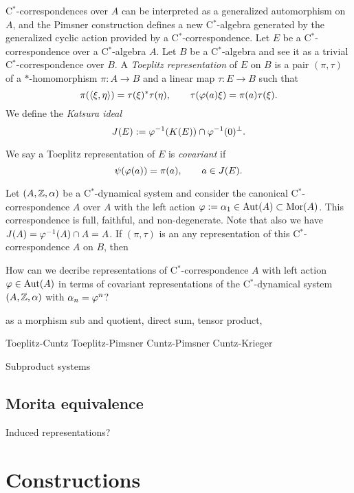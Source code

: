 \documentclass{../../large}
\begin{document}
\begin{prb}
C$^*$-correspondences over $A$ can be interpreted as a generalized automorphism on $A$, and the Pimsner construction defines a new C$^*$-algebra generated by the generalized cyclic action provided by a C$^*$-correspondence.
Let $E$ be a C$^*$-correspondence over a C$^*$-algebra $A$.
Let $B$ be a C$^*$-algebra and see it as a trivial C$^*$-correspondence over $B$.
A \emph{Toeplitz representation} of $E$ on $B$ is a pair $(\pi,\tau)$ of a $*$-homomorphism $\pi:A\to B$ and a linear map $\tau:E\to B$ such that
\[\pi(\langle\xi,\eta\rangle)=\tau(\xi)^*\tau(\eta),\qquad\tau(\varphi(a)\xi)=\pi(a)\tau(\xi).\]
We define the \emph{Katsura ideal}
\[J(E):=\varphi^{-1}(K(E))\cap\varphi^{-1}(0)^\perp.\]

We say a Toeplitz representation of $E$ is \emph{covariant} if
\[\psi(\varphi(a))=\pi(a),\qquad a\in J(E).\]
\begin{parts}
\item
Let $(A,\mathbb{Z},\alpha)$ be a C$^*$-dynamical system and consider the canonical C$^*$-correspondence $A$ over $A$ with the left action $\varphi:=\alpha_1\in\operatorname{Aut}(A)\subset\operatorname{Mor}(A)$.
This correspondence is full, faithful, and non-degenerate.
Note that also we have $J(A)=\varphi^{-1}(A)\cap A=A$.
If $(\pi,\tau)$ is an any representation of this C$^*$-correspondence $A$ on $B$, then 
\end{parts}
\end{prb}

How can we decribe representations of C$^*$-correspondence $A$ with left action $\varphi\in\operatorname{Aut}(A)$ in terms of covariant representations of the C$^*$-dynamical system $(A,\mathbb{Z},\alpha)$ with $\alpha_n=\varphi^n$?



as a morphism
sub and quotient, direct sum, tensor product,

Toeplitz-Cuntz
Toeplitz-Pimsner
Cuntz-Pimsner
Cuntz-Krieger



Subproduct systems


\section{Morita equivalence}



Induced representations?







\chapter{Constructions}
\end{document}
